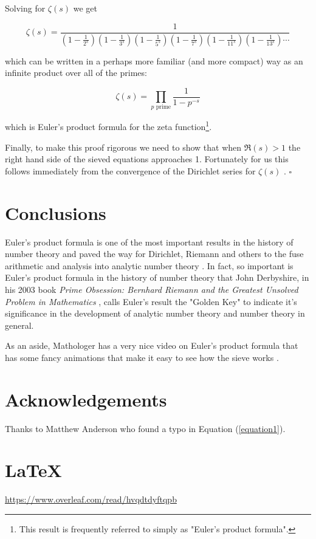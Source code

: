 \documentclass[11pt, oneside]{article}   	%
\begin{document}
\bigskip
\noindent
Solving for $\zeta(s)$ we get

\bigskip
\begin{equation*}
\zeta (s) = \frac {1}{\left ( 1 - \frac {1}{2^{s}} \right ) \left
( 1 - \frac {1}{3^{s}} \right ) \left ( 1 - \frac {1}{5^{s}}
\right ) \left ( 1 - \frac {1}{7^{s}} \right )  
 \left ( 1 - \frac {1}{11^{s}} \right ) \left ( 1 - \frac {1}{13^{s}} \right )\cdots}
\end{equation*}

\bigskip
\bigskip
\noindent
which can be written in a perhaps more familiar (and more
compact) way as an infinite product over all of the primes:

\bigskip
\begin{equation*}
\zeta (s) = \prod _{p{\text{ prime}}} \frac {1}{1-p^{-s}}
\end{equation*}

\bigskip
\noindent
which is Euler's product formula for the zeta
function\footnote{This result is frequently referred to simply as
"Euler's product formula".}.

\bigskip
\noindent
Finally, to make this proof rigorous we need to show that when
$\Re (s) > 1$ the right hand side of the sieved equations
approaches 1.  Fortunately for us this follows immediately from
the convergence of the Dirichlet series for $\zeta(s)$
\cite{wiki:dirichlet_series}. $\square$

\section{Conclusions}
Euler's product formula is one of the most important results in
the history of number theory and paved the way for Dirichlet,
Riemann and others to the fuse arithmetic and analysis into
analytic number theory \cite{wiki:analytic_number_theory}.  In
fact, so important is Euler's product formula in the history of
number theory that John Derbyshire, in his 2003 book \emph{Prime
Obsession: Bernhard Riemann and the Greatest Unsolved Problem in
Mathematics} \cite{book:prime_obsession}, calls Euler's result
the "Golden Key" to indicate it's significance in the development
of analytic number theory and number theory in general.

\bigskip
\noindent
As an aside, Mathologer has a very nice video on Euler's product
formula that has some fancy animations that make it easy to see
how the sieve works \cite{mathologer:eulers_product_formula}.
%
%
%
\section*{Acknowledgements}
Thanks to Matthew Anderson who found a typo in 
Equation (\ref{equation1}).

%
%
\section*{\LaTeX}
\url{https://www.overleaf.com/read/hvqdtdyftqpb}
%
%
%


%
\end{document}
